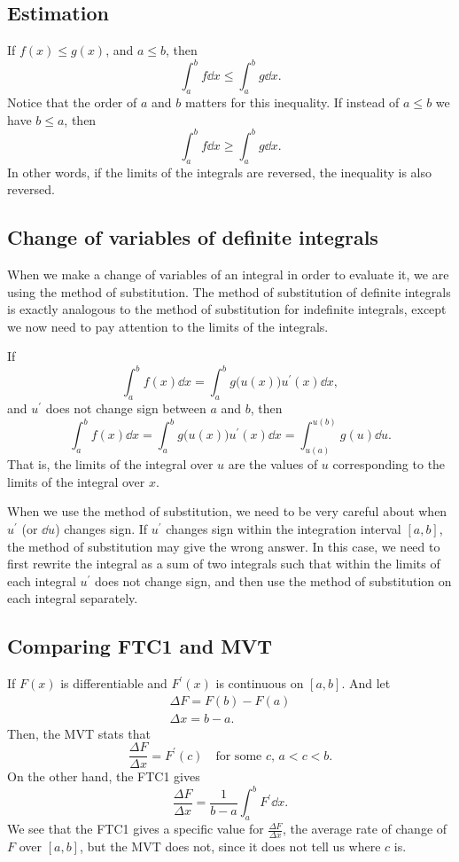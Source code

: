\subsection{Estimation}
If $f(x)\leq g(x)$, and $a\leq b$, then
\[\int_a^bf\dd x\leq\int_a^bg\dd x.\]
Notice that the order of $a$ and $b$ matters for this inequality. If instead of $a\leq b$ we have $b\leq a$, then
\[\int_a^bf\dd x\geq\int_a^bg\dd x.\]
In other words, if the limits of the integrals are reversed, the inequality is also reversed.
\subsection{Change of variables of definite integrals}
When we make a change of variables of an integral in order to evaluate it, we are using the method of substitution. The method of substitution of definite integrals is exactly analogous to the method of substitution for indefinite integrals, except we now need to pay attention to the limits of the integrals.

If
\[\int_a^bf(x)\dd x=\int_a^b g\lparen u(x)\rparen u^\prime(x)\dd x,\]
and $u^\prime$ does not change sign between $a$ and $b$, then
\[\int_a^bf(x)\dd x=\int_a^bg\lparen u(x)\rparen u^\prime(x)\dd x=\int_{u(a)}^{u(b)}g(u)\dd u.\]
That is, the limits of the integral over $u$ are the values of $u$ corresponding to the limits of the integral over $x$.
\begin{note}[Caution]
When we use the method of substitution, we need to be very careful about when $u^\prime$ (or $\dd u$) changes sign. If $u^\prime$ changes sign within the integration interval $[a,b]$, the method of substitution may give the wrong answer. In this case, we need to first rewrite the integral as a sum of two integrals such that within the limits of each integral $u^\prime$ does not change sign, and then use the method of substitution on each integral separately.
\end{note}
\subsection{Comparing FTC1 and MVT}
If $F(x)$ is differentiable and $F^\prime(x)$ is continuous on $[a,b]$. And let
\begin{gather*}
\Delta F=F(b)-F(a)\\
\Delta x=b-a.
\end{gather*}
Then, the MVT stats that
\[\frac{\Delta F}{\Delta x}=F^\prime(c)\quad\text{for some $c$, $a<c<b$}.\]
On the other hand, the FTC1 gives
\[\frac{\Delta F}{\Delta x}=\frac1{b-a}\int_a^bF^\prime\dd x.\]
We see that the FTC1 gives a specific value for $\frac{\Delta F}{\Delta x}$, the average rate of change of $F$ over $[a,b]$, but the MVT does not, since it does not tell us where $c$ is.


